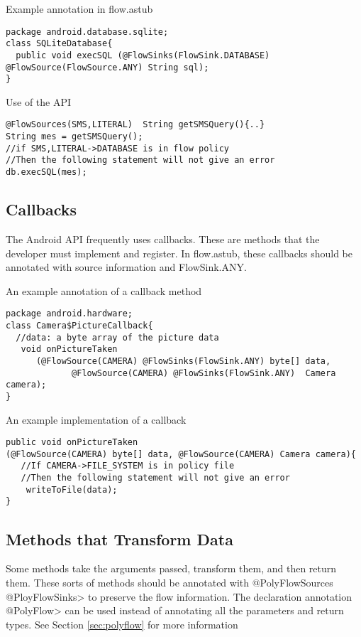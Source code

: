 Example annotation in flow.astub
\begin{Verbatim}
package android.database.sqlite;
class SQLiteDatabase{
  public void execSQL (@FlowSinks(FlowSink.DATABASE) @FlowSource(FlowSource.ANY) String sql);
}
\end{Verbatim}
Use of the API
\begin{Verbatim}
@FlowSources(SMS,LITERAL)  String getSMSQuery(){..}
String mes = getSMSQuery();
//if SMS,LITERAL->DATABASE is in flow policy
//Then the following statement will not give an error
db.execSQL(mes);
\end{Verbatim}

\subsection{Callbacks}
The Android API frequently uses callbacks.  These are methods that the developer must 
implement and register. In flow.astub, these callbacks should be annotated
with source information and FlowSink.ANY.  

An example annotation of a callback method
\begin{Verbatim}
package android.hardware;
class Camera$PictureCallback{
  //data: a byte array of the picture data
   void onPictureTaken 
      (@FlowSource(CAMERA) @FlowSinks(FlowSink.ANY) byte[] data, 
             @FlowSource(CAMERA) @FlowSinks(FlowSink.ANY)  Camera camera);
}
\end{Verbatim}

An example implementation of a callback
\begin{Verbatim}
public void onPictureTaken
(@FlowSource(CAMERA) byte[] data, @FlowSource(CAMERA) Camera camera){
   //If CAMERA->FILE_SYSTEM is in policy file
   //Then the following statement will not give an error
    writeToFile(data);
}
\end{Verbatim}


\subsection{Methods that Transform Data}

Some methods take the arguments passed, transform them, and then return them.  These sorts of 
methods should be annotated with \<@PolyFlowSources @PloyFlowSinks>
  to preserve the flow information.  The declaration annotation \<@PolyFlow> can be used instead of
  annotating all the parameters and return types. See Section \ref{sec:polyflow} for more information 
  
